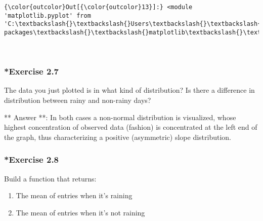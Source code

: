 \documentclass[11pt]{article}
\providecommand{\tightlist}{%
      \setlength{\itemsep}{0pt}\setlength{\parskip}{0pt}}
\begin{document}
\begin{Verbatim}[commandchars=\\\{\}]
{\color{outcolor}Out[{\color{outcolor}13}]:} <module 'matplotlib.pyplot' from 'C:\textbackslash{}\textbackslash{}Users\textbackslash{}\textbackslash{}chara\textbackslash{}\textbackslash{}Anaconda3\textbackslash{}\textbackslash{}lib\textbackslash{}\textbackslash{}site-packages\textbackslash{}\textbackslash{}matplotlib\textbackslash{}\textbackslash{}pyplot.py'>
\end{Verbatim}
            
    \begin{center}
    \end{center}
    { \hspace*{\fill} \\}
    
    \subsubsection{*Exercise 2.7}\label{exercise-2.7}

The data you just plotted is in what kind of distribution? Is there a
difference in distribution between rainy and non-rainy days?

    ** Answer **: In both cases a non-normal distribution is visualized,
whose highest concentration of observed data (fashion) is concentrated
at the left end of the graph, thus characterizing a positive
(asymmetric) slope distribution.

    \subsubsection{*Exercise 2.8}\label{exercise-2.8}

Build a function that returns:

\begin{enumerate}
\def\labelenumi{\arabic{enumi}.}
\tightlist
\item
  The mean of entries when it's raining
\item
  The mean of entries when it's not raining
\end{enumerate}
\end{document}
